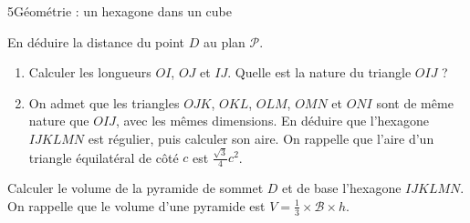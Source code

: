 \begin{exoBac}{5}{Géométrie : un hexagone dans un cube}
\begin{questions}[start=3]
    En déduire la distance du point $D$ au plan $\mathcal{P}$.
  \item \begin{enumerate}[label=\alph*),leftmargin=1.4em,itemsep=0.4mm,topsep=0.4mm]
      \item Calculer les longueurs $OI$, $OJ$ et $IJ$. Quelle est la nature du triangle $OIJ$ ?
      \item On admet que les triangles $OJK$, $OKL$, $OLM$, $OMN$ et $ONI$ sont de même nature que $OIJ$, avec les mêmes dimensions. En
        déduire que l'hexagone $IJKLMN$ est régulier, puis calculer son aire. On rappelle que l'aire d'un triangle équilatéral de côté
        $c$ est $\frac{\sqrt3}{4}c^{2}$.
    \end{enumerate}
  \item Calculer le volume de la pyramide de sommet $D$ et de base l'hexagone $IJKLMN$. On rappelle que le volume d'une pyramide est
    $V=\frac13\times\mathcal{B}\times h$.
\end{questions}
\end{exoBac}

